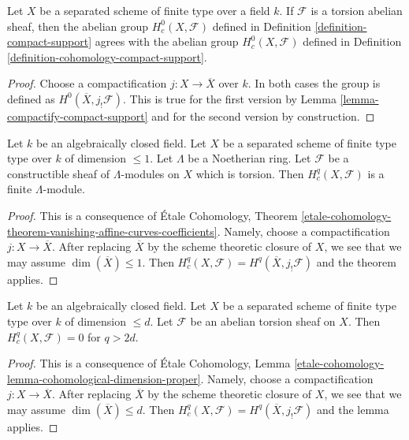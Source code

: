 \begin{lemma}
\label{lemma-compact-support-h0}
Let $X$ be a separated scheme of finite type over a field $k$.
If $\mathcal{F}$ is a torsion abelian sheaf, then the abelian group
$H^0_c(X, \mathcal{F})$ defined in Definition \ref{definition-compact-support}
agrees with the abelian group $H^0_c(X, \mathcal{F})$ defined in
Definition \ref{definition-cohomology-compact-support}.
\end{lemma}

\begin{proof}
Choose a compactification $j : X \to \overline{X}$ over $k$.
In both cases the group is defined as $H^0(\overline{X}, j_!\mathcal{F})$.
This is true for the first version by
Lemma \ref{lemma-compactify-compact-support}
and for the second version by construction.
\end{proof}

\begin{lemma}
\label{lemma-finiteness-curves}
Let $k$ be an algebraically closed field. Let $X$ be a separated
scheme of finite type type over $k$ of dimension $\leq 1$.
Let $\Lambda$ be a Noetherian ring.
Let $\mathcal{F}$ be a constructible sheaf of $\Lambda$-modules
on $X$ which is torsion. Then $H^q_c(X, \mathcal{F})$ is a
finite $\Lambda$-module.
\end{lemma}

\begin{proof}
This is a consequence of \'Etale Cohomology, Theorem
\ref{etale-cohomology-theorem-vanishing-affine-curves-coefficients}.
Namely, choose a compactification $j : X \to \overline{X}$.
After replacing $\overline{X}$ by the scheme theoretic closure
of $X$, we see that we may assume $\dim(\overline{X}) \leq 1$.
Then $H^q_c(X, \mathcal{F}) = H^q(\overline{X}, j_!\mathcal{F})$
and the theorem applies.
\end{proof}

\begin{lemma}
\label{lemma-bounded-algebraic-scheme}
Let $k$ be an algebraically closed field. Let $X$ be a separated
scheme of finite type type over $k$ of dimension $\leq d$.
Let $\mathcal{F}$ be an abelian torsion sheaf on $X$.
Then $H^q_c(X, \mathcal{F}) = 0$ for $q > 2d$.
\end{lemma}

\begin{proof}
This is a consequence of \'Etale Cohomology, Lemma
\ref{etale-cohomology-lemma-cohomological-dimension-proper}.
Namely, choose a compactification $j : X \to \overline{X}$.
After replacing $\overline{X}$ by the scheme theoretic closure
of $X$, we see that we may assume $\dim(\overline{X}) \leq d$.
Then $H^q_c(X, \mathcal{F}) = H^q(\overline{X}, j_!\mathcal{F})$
and the lemma applies.
\end{proof}

